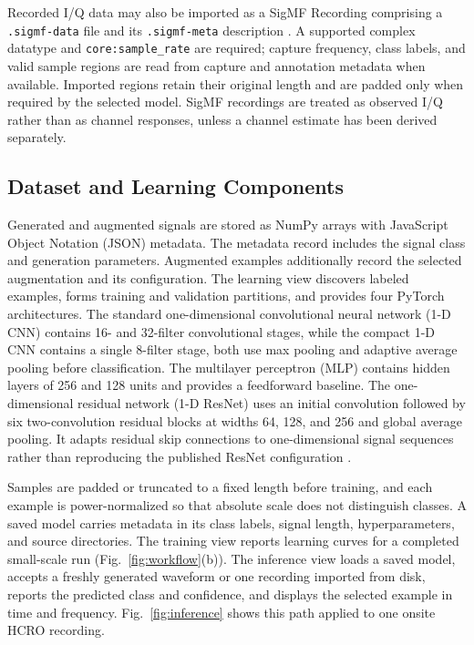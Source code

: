 \documentclass[10pt,conference,letterpaper]{IEEEtran}
\begin{document}
Recorded I/Q data may also be imported as a SigMF Recording comprising a \texttt{.sigmf-data} file and its \texttt{.sigmf-meta} description \cite{sigmf}. A supported complex datatype and \texttt{core:sample\_rate} are required; capture frequency, class labels, and valid sample regions are read from capture and annotation metadata when available. Imported regions retain their original length and are padded only when required by the selected model. SigMF recordings are treated as observed I/Q rather than as channel responses, unless a channel estimate has been derived separately.


\subsection{Dataset and Learning Components}

Generated and augmented signals are stored as NumPy arrays with JavaScript Object Notation (JSON) metadata. The metadata record includes the signal class and generation parameters. Augmented examples additionally record the selected augmentation and its configuration. The learning view discovers labeled examples, forms training and validation partitions, and provides four PyTorch architectures. The standard one-dimensional convolutional neural network (1-D CNN) contains 16- and 32-filter convolutional stages, while the compact 1-D CNN contains a single 8-filter stage, both use max pooling and adaptive average pooling before classification. The multilayer perceptron (MLP) contains hidden layers of 256 and 128 units and provides a feedforward baseline. The one-dimensional residual network (1-D ResNet) uses an initial convolution followed by six two-convolution residual blocks at widths 64, 128, and 256 and global average pooling. It adapts residual skip connections to one-dimensional signal sequences rather than reproducing the published ResNet configuration \cite{he2016}.

Samples are padded or truncated to a fixed length before training, and each example is power-normalized so that absolute scale does not distinguish classes. A saved model carries metadata in its class labels, signal length, hyperparameters, and source directories. The training view reports learning curves for a completed small-scale run (Fig.~\ref{fig:workflow}(b)). The inference view loads a saved model, accepts a freshly generated waveform or one recording imported from disk, reports the predicted class and confidence, and displays the selected example in time and frequency. Fig.~\ref{fig:inference} shows this path applied to one onsite HCRO recording.
\end{document}
